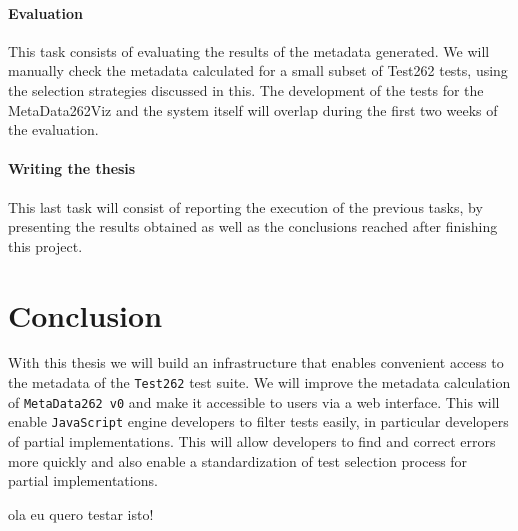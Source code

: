 \documentclass[runningheads]{llncs}
\begin{document}
\paragraph{Evaluation}
This task consists of evaluating the results of the metadata generated. We will manually check the metadata calculated for a small subset of Test262 tests, using the selection strategies discussed in this. The development of the tests for the MetaData262Viz and the system itself will overlap during the first two weeks of the evaluation.


\paragraph{Writing the thesis}
This last task will consist of reporting the execution of the previous tasks, by presenting the results obtained as well as the conclusions reached after finishing this project.




\section{Conclusion}
\label{sec:Conclusion}
With this thesis we will build an infrastructure that enables convenient access to the metadata of the \texttt{Test262} test suite. We will improve the metadata calculation of \texttt{MetaData262 v0} and make it accessible to users via a web interface. This will enable \texttt{JavaScript} engine developers to filter tests easily, in particular developers of partial implementations. This will allow developers to find and correct errors more quickly and also enable a standardization of test selection process for partial implementations.

ola eu quero testar isto!


%
%

%
%
%
% 
% 
%


\end{document}
